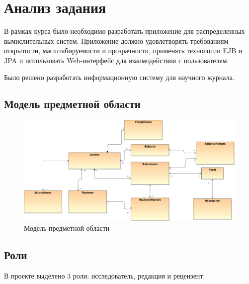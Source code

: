 \section{Анализ задания}
В рамках курса было необходимо разработать приложение для распределенных вычислительных систем. Приложение должно удовлетворять требованиям открытости, масштабируемости и прозрачности, применять технологии EJB и JPA и использовать Web-интерфейс для взаимодействия с пользователем.

Было решено разработать информационную систему для научного журнала.

\subsection{Модель предметной области}

\begin{figure}[H]
\centering
\includegraphics[width=\textwidth]{ClassDiagram.pdf}
\caption{Модель предметной области}
\end{figure}

\subsection{Роли}

В проекте выделено 3 роли: исследователь, редакция и рецензент:

